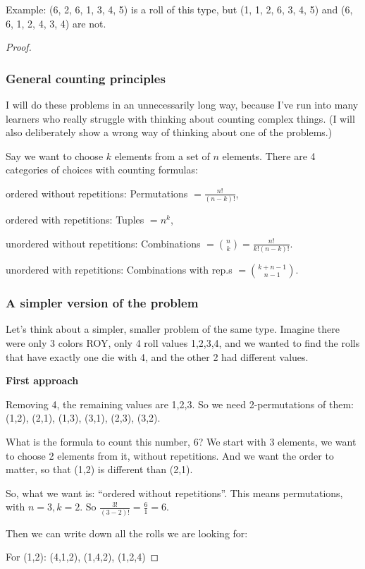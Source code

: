\documentclass[14pt]{extarticle}
\begin{document}
Example: (6, 2, 6, 1, 3, 4, 5) is a roll of this type, but (1, 1, 2, 6, 3, 4, 5) and (6, 6, 1, 2, 4, 3, 4) are not.
\begin{proof}
\subsubsection{General counting principles}
I will do these problems in an unnecessarily long way, because I've run into many learners who really struggle with thinking about counting complex things. (I will also deliberately show a wrong way of thinking about one of the problems.)

Say we want to choose $k$ elements from a set of $n$ elements. There are 4 categories of choices with counting formulas: 

ordered without repetitions: Permutations $\displaystyle = \frac{n!}{(n-k)!}$,

ordered with repetitions: Tuples $ = n^k$,

unordered without repetitions: Combinations $\displaystyle = \binom{n}{k} = \frac{n!}{k!(n-k)!}$.

unordered with repetitions: Combinations with rep.s $\displaystyle = \binom{k+n-1}{n-1}$.

\subsubsection{A simpler version of the problem}
Let's think about a simpler, smaller problem of the same type. Imagine there were only 3 colors ROY, only 4 roll values 1,2,3,4, and we wanted to find the rolls that have exactly one die with 4, and the other 2 had different values.

{\bf First approach}

Removing 4, the remaining values are 1,2,3. So we need 2-permutations of them: (1,2), (2,1), (1,3), (3,1), (2,3), (3,2). 

What is the formula to count this number, 6? We start with 3 elements, we want to choose 2 elements from it, without repetitions. And we want the order to matter, so that (1,2) is different than (2,1).

So, what we want is: ``ordered without repetitions''. This means permutations, with $n = 3, k = 2$. So $\frac{3!}{(3-2)!} = \frac{6}{1} = 6$.

Then we can write down all the rolls we are looking for:

For (1,2): (4,1,2), (1,4,2), (1,2,4)


\end{proof}
\end{document}
